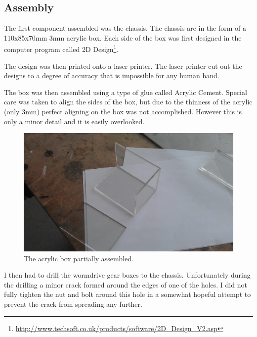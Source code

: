 \documentclass[]{report}   %
\begin{document}
					\subsection{Assembly}
						The first component assembled was the chassis. The chassis are in the form of a 110x85x70mm 3mm acrylic box. Each side of the box was first
						designed in the computer program called 2D Design\footnote{\url{http://www.techsoft.co.uk/products/software/2D_Design_V2.asp}}. 
						
						The design was then printed onto a laser printer. The laser printer cut out the designs to a degree of accuracy that is impossible for any
						human hand.		
						
						The box was then assembled using a type of glue called Acrylic Cement. Special care was taken to align the sides of the box, but due to the thinness
						of the acrylic (only 3mm) perfect aligning on the box was not accomplished. However this is only a minor detail and it is easily overlooked.
						
						\begin{figure}[h]
							\caption{The acrylic box partially assembled.}
							\includegraphics[width=\textwidth,height=\textheight,keepaspectratio]{images/almostdone}
						\end{figure}
						
						I then had to drill the wormdrive gear boxes to the chassis. Unfortunately during the drilling a minor crack formed around the edges of one of the holes.
						I did not fully tighten the nut and bolt around this hole in a somewhat hopeful attempt to prevent the crack from spreading any further.
						
\end{document}
